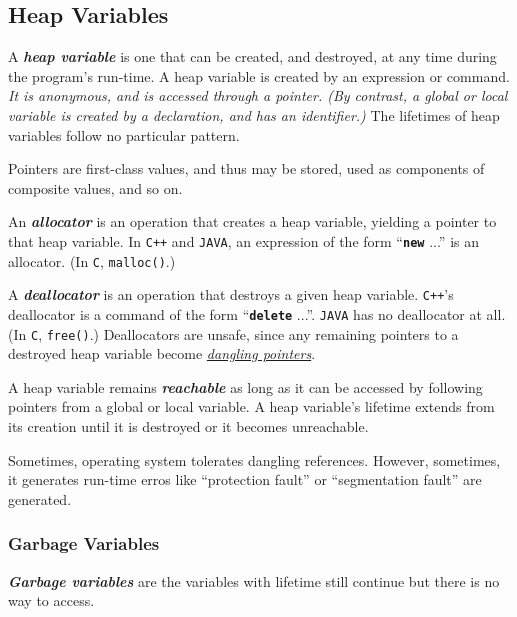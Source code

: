 \begin{multicols}{2}
\setlength{\columnsep}{1.5cm}
\setlength{\columnseprule}{0.2pt}

\subsection{Heap Variables}

A \textit{\textbf{heap variable}} is one that can be created, and destroyed, at any time during the program's run-time. A heap variable is created by an expression or command. \textit{It is anonymous, and is accessed through a pointer. (By contrast, a global or local variable is created by a declaration, and has an identifier.)} The lifetimes of heap variables follow no particular pattern. 

Pointers are first-class values, and thus may be stored, used as components of composite values, and so on. 

An \textit{\textbf{allocator}} is an operation that creates a heap variable, yielding a pointer to that heap variable. In \texttt{C++} and \texttt{JAVA}, an expression of the form ``\texttt{\textbf{new}} ...'' is an allocator. (In \texttt{C}, \texttt{malloc()}.)

A \textit{\textbf{deallocator}} is an operation that destroys a given heap variable. \texttt{C++}'s deallocator is a command of the form ``\texttt{\textbf{delete}} ...''. \texttt{JAVA} has no deallocator at all. (In \texttt{C}, \texttt{free()}.) Deallocators are unsafe, since any remaining pointers to a destroyed heap variable become \hyperref[sec:dangling-pointers]{\textit{dangling pointers}}.

A heap variable remains \textit{\textbf{reachable}} as long as it can be accessed by following pointers from a global or local variable. A heap variable's lifetime extends from its creation until it is destroyed or it becomes unreachable.

Sometimes, operating system tolerates dangling references. However, sometimes, it generates run-time erros like ``protection fault'' or ``segmentation fault'' are generated.

\subsubsection{Garbage Variables}

\textit{\textbf{Garbage variables}} are the variables with lifetime still continue but there is no way to access.


\end{multicols}
